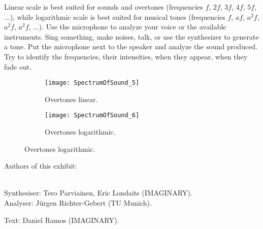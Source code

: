Linear scale is best suited for sounds and overtones (frequencies $f$, $2f$, $3f$, $4f$, $5f$, ...), while logarithmic scale is best suited for musical tones (frequencies $f$, $af$, $a^2 f$, $a^2 f$, $a^2 f$, ...). Use the microphone to analyze your voice or the available instruments. Sing something, make noises, talk, or use the synthesizer to generate a tone. Put the microphone next to the speaker and analyze the sound produced. Try to identify the frequencies, their intensities, when they appear, when they fade out.


\begin{figure}[h]
\centering
\begin{subfigure}{0.45\textwidth}
\centering
\texttt{[image: SpectrumOfSound\_5]}
\caption*{Overtones linear.}
\end{subfigure}
\begin{subfigure}{0.45\textwidth}
\centering
\texttt{[image: SpectrumOfSound\_6]}
\caption*{Overtones logarithmic.}
\end{subfigure}
\end{figure}


\begin{sectcredits}

\item[Authors of this exhibit:]\strut \\
Synthesiser: Tero Parviainen, Eric Londaits (IMAGINARY).\\
Analyser: Jürgen Richter-Gebert (TU Munich).

\item[Text:] Daniel Ramos (IMAGINARY).

\end{sectcredits}
